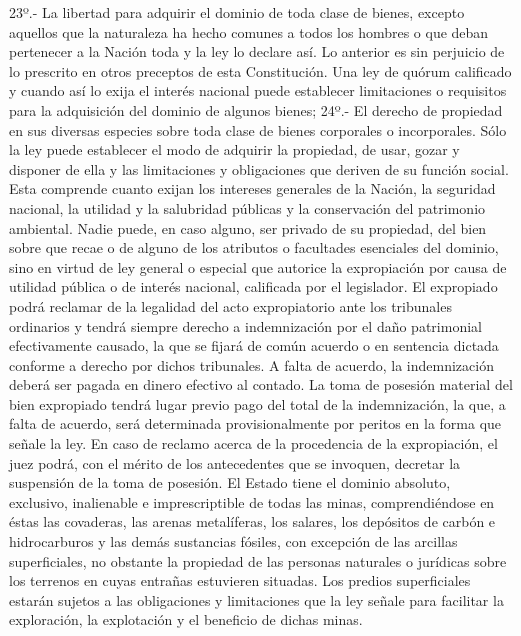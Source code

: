     23º.- La libertad para adquirir el dominio de toda clase de bienes, excepto aquellos que la naturaleza ha hecho comunes a todos los hombres o que deban pertenecer a la Nación toda y la ley lo declare así. Lo anterior es sin perjuicio de lo prescrito en otros preceptos de esta Constitución.
    Una ley de quórum calificado y cuando así lo exija el interés nacional puede establecer limitaciones o requisitos para la adquisición del dominio de algunos bienes;
    24º.- El derecho de propiedad en sus diversas especies sobre toda clase de bienes corporales o incorporales.
    Sólo la ley puede establecer el modo de adquirir la propiedad, de usar, gozar y disponer de ella y las limitaciones y obligaciones que deriven de su función social. Esta comprende cuanto exijan los intereses generales de la Nación, la seguridad nacional, la utilidad y la salubridad públicas y la conservación del patrimonio ambiental.
    Nadie puede, en caso alguno, ser privado de su propiedad, del bien sobre que recae o de alguno de los atributos o facultades esenciales del dominio, sino en virtud de ley general o especial que autorice la expropiación por causa de utilidad pública o de interés nacional, calificada por el legislador. El expropiado podrá reclamar de la legalidad del acto expropiatorio ante los tribunales ordinarios y tendrá siempre derecho a indemnización por el daño patrimonial efectivamente causado, la que se fijará de común acuerdo o en sentencia dictada conforme a derecho por dichos tribunales.
    A falta de acuerdo, la indemnización deberá ser pagada en dinero efectivo al contado.
    La toma de posesión material del bien expropiado tendrá lugar previo pago del total de la indemnización, la que, a falta de acuerdo, será determinada provisionalmente por peritos en la forma que señale la ley. En caso de reclamo acerca de la procedencia de la expropiación, el juez podrá, con el mérito de los antecedentes que se invoquen, decretar la suspensión de la toma de posesión.
    El Estado tiene el dominio absoluto, exclusivo, inalienable e imprescriptible de todas las minas, comprendiéndose en éstas las covaderas, las arenas metalíferas, los salares, los depósitos de carbón e hidrocarburos y las demás sustancias fósiles, con excepción de las arcillas superficiales, no obstante la propiedad de las personas naturales o jurídicas sobre los terrenos en cuyas entrañas estuvieren situadas. Los predios superficiales estarán sujetos a las obligaciones y limitaciones que la ley señale para facilitar la exploración, la explotación y el beneficio de dichas minas.
